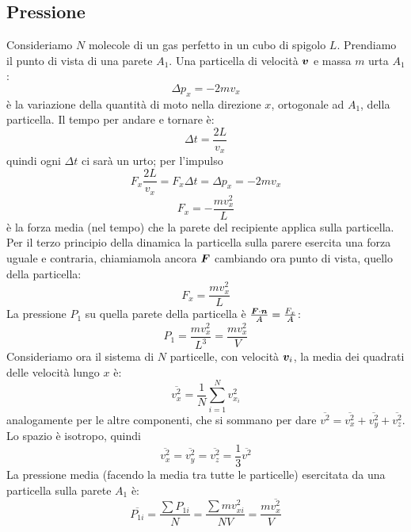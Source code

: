 \subsection{Pressione}
Consideriamo $N$ molecole di un gas perfetto in un cubo di spigolo $L$. Prendiamo il punto di vista di una parete $A_1$. Una particella di velocità $\boldsymbol{v}$ e massa $m$ urta $A_1$:
\begin{equation}
\Delta p_x=-2mv_x
\end{equation}
è la variazione della quantità di moto nella direzione $x$, ortogonale ad $A_1$, della particella. Il tempo per andare e tornare è:
\begin{equation}
\Delta t=\frac{2L}{v_x}
\end{equation}
quindi ogni $\Delta t$ ci sarà un urto; per l'impulso
\begin{equation*}
F_x\frac{2L}{v_x}=F_x\Delta t=\Delta p_x=-2mv_x
\end{equation*}
\begin{equation}
F_x=-\frac{mv_x^2}{L}
\end{equation}
è la forza media (nel tempo) che la parete del recipiente applica sulla particella. Per il terzo principio della dinamica la particella sulla parere esercita una forza uguale e contraria, chiamiamola ancora $\boldsymbol{F}$ cambiando ora punto di vista, quello della particella:
\begin{equation}
F_x=\frac{mv_x^2}{L}
\end{equation}
La pressione $P_1$ su quella parete della particella è $\frac{\boldsymbol{F}\cdot \boldsymbol{n}}{A}=\frac{F_x}{A}$:
\begin{equation}
P_1=\frac{mv_x^2}{L^3}=\frac{mv_x^2}{V}
\end{equation}
Consideriamo ora il sistema di $N$ particelle, con velocità $\boldsymbol{v}_i$, la media dei quadrati delle velocità lungo $x$ è:
\begin{equation}
\overline{v_x^2}=\frac{1}{N}\sum_{i=1}^{N}{v_{x_i}^2}
\end{equation}
analogamente per le altre componenti, che si sommano per dare $\overline {v^2}=\overline{v_x^2}+\overline{v_y^2}+\overline{v_z^2}$. Lo spazio è isotropo, quindi
\begin{equation}
\overline{v_x^2}=\overline{v_y^2}=\overline{v_z^2}=\frac{1}{3}\overline{v^2}
\end{equation}
La pressione media (facendo la media tra tutte le particelle) esercitata da una particella sulla parete $A_1$ è:
\begin{equation*}\overline {P_{1i}} = \frac{\sum P_{1i}}{N}=\frac{\sum m v_{xi}^2}{NV}=\frac{m\overline{v_x^2}}{V}\end{equation*}
